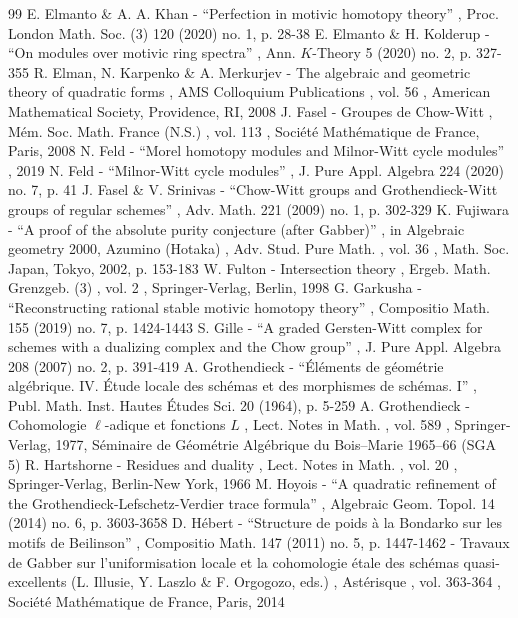 \documentclass[11pt]{article}
\numberwithin{equation}{section}\renewcommand{\encodingdefault}{TU}
\theoremstyle{remark}
\theoremstyle{definition}
\numberwithin{equation}{thm}
\begin{document}
\begin{thebibliography}{99}
 E. Elmanto \& A. A. Khan - “Perfection in motivic homotopy theory” , Proc. London Math. Soc. (3) 120 (2020) no. 1, p. 28-38
 E. Elmanto \& H. Kolderup - “On modules over motivic ring spectra” , Ann. $K$-Theory 5 (2020) no. 2, p. 327-355
 R. Elman, N. Karpenko \& A. Merkurjev - The algebraic and geometric theory of quadratic forms , AMS Colloquium Publications , vol. 56 , American Mathematical Society, Providence, RI, 2008
 J. Fasel - Groupes de Chow-Witt , Mém. Soc. Math. France (N.S.) , vol. 113 , Société Mathématique de France, Paris, 2008
 N. Feld - “Morel homotopy modules and Milnor-Witt cycle modules” , 2019
 N. Feld - “Milnor-Witt cycle modules” , J. Pure Appl. Algebra 224 (2020) no. 7, p. 41
 J. Fasel \& V. Srinivas - “Chow-Witt groups and Grothendieck-Witt groups of regular schemes” , Adv. Math. 221 (2009) no. 1, p. 302-329
 K. Fujiwara - “A proof of the absolute purity conjecture (after Gabber)” , in Algebraic geometry 2000, Azumino (Hotaka) , Adv. Stud. Pure Math. , vol. 36 , Math. Soc. Japan, Tokyo, 2002, p. 153-183
 W. Fulton - Intersection theory , Ergeb. Math. Grenzgeb. (3) , vol. 2 , Springer-Verlag, Berlin, 1998
 G. Garkusha - “Reconstructing rational stable motivic homotopy theory” , Compositio Math. 155 (2019) no. 7, p. 1424-1443
 S. Gille - “A graded Gersten-Witt complex for schemes with a dualizing complex and the Chow group” , J. Pure Appl. Algebra 208 (2007) no. 2, p. 391-419
 A. Grothendieck - “Éléments de géométrie algébrique. IV. Étude locale des schémas et des morphismes de schémas. I” , Publ. Math. Inst. Hautes Études Sci. 20 (1964), p. 5-259
 A. Grothendieck - Cohomologie $\ell $-adique et fonctions ${L}$ , Lect. Notes in Math. , vol. 589 , Springer-Verlag, 1977, Séminaire de Géométrie Algébrique du Bois–Marie 1965–66 (SGA 5)
 R. Hartshorne - Residues and duality , Lect. Notes in Math. , vol. 20 , Springer-Verlag, Berlin-New York, 1966
 M. Hoyois - “A quadratic refinement of the Grothendieck-Lefschetz-Verdier trace formula” , Algebraic Geom. Topol. 14 (2014) no. 6, p. 3603-3658
 D. Hébert - “Structure de poids à la Bondarko sur les motifs de Beilinson” , Compositio Math. 147 (2011) no. 5, p. 1447-1462
 - Travaux de Gabber sur l’uniformisation locale et la cohomologie étale des schémas quasi-excellents (L. Illusie, Y. Laszlo \& F. Orgogozo, eds.) , Astérisque , vol. 363-364 , Société Mathématique de France, Paris, 2014

\end{thebibliography}
\end{document}
